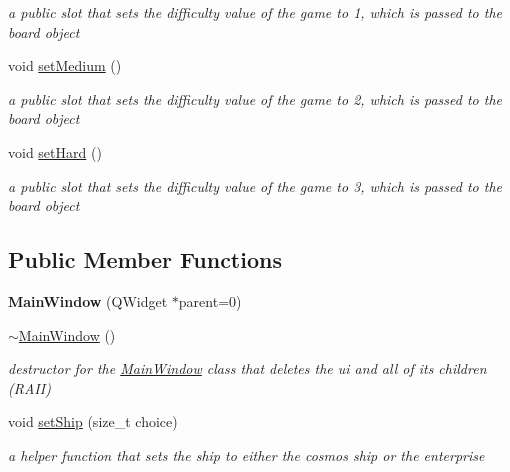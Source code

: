 \begin{DoxyCompactItemize}
\begin{DoxyCompactList}\small\item\em a public slot that sets the difficulty value of the game to 1, which is passed to the board object \end{DoxyCompactList}\item 
void \hyperlink{class_main_window_aaa0c79a3a1fba70aafe0f24dce424119}{set\+Medium} ()
\begin{DoxyCompactList}\small\item\em a public slot that sets the difficulty value of the game to 2, which is passed to the board object \end{DoxyCompactList}\item 
void \hyperlink{class_main_window_a349017d74bcea50a8254544c70b7b118}{set\+Hard} ()
\begin{DoxyCompactList}\small\item\em a public slot that sets the difficulty value of the game to 3, which is passed to the board object \end{DoxyCompactList}\end{DoxyCompactItemize}
\subsection*{Public Member Functions}
\begin{DoxyCompactItemize}
\item 
\hypertarget{class_main_window_a8b244be8b7b7db1b08de2a2acb9409db}{}{\bfseries Main\+Window} (Q\+Widget $\ast$parent=0)\label{class_main_window_a8b244be8b7b7db1b08de2a2acb9409db}

\item 
\hypertarget{class_main_window_ae98d00a93bc118200eeef9f9bba1dba7}{}\hyperlink{class_main_window_ae98d00a93bc118200eeef9f9bba1dba7}{$\sim$\+Main\+Window} ()\label{class_main_window_ae98d00a93bc118200eeef9f9bba1dba7}

\begin{DoxyCompactList}\small\item\em destructor for the \hyperlink{class_main_window}{Main\+Window} class that deletes the ui and all of its children (R\+A\+I\+I) \end{DoxyCompactList}\item 
void \hyperlink{class_main_window_a1e4e82b8242ca26edec38b111d990295}{set\+Ship} (size\+\_\+t choice)
\begin{DoxyCompactList}\small\item\em a helper function that sets the ship to either the cosmos ship or the enterprise \end{DoxyCompactList}\end{DoxyCompactItemize}


